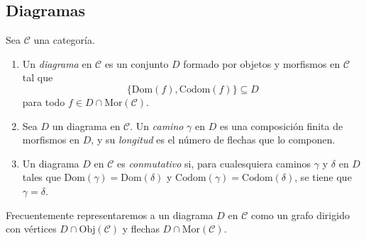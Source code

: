 \documentclass[tesis]{subfiles}
\begin{document}
%
%

\subsection*{Diagramas} \label{Ssec: Diagramas}

\begin{Def}

    Sea $\mathscr{C}$ una categoría. 
    \begin{enumerate}[label=(\alph*)]
    
        \item Un \emph{diagrama} en $\mathscr{C}$ es un conjunto $D$ formado por objetos y morfismos en $\mathscr{C}$ tal que
            \[
            \{\text{Dom}(f), \text{Codom}(f)\}\subseteq D
            \] 
            para todo $f\in D\cap\text{Mor}(\mathscr{C})$.

        \item Sea $D$ un diagrama en $\mathscr{C}$. Un \emph{camino} $\gamma$ en $D$ es una composición finita de morfismos en $D$, y su \emph{longitud} es el número de flechas que lo componen.

        \item Un diagrama $D$ en $\mathscr{C}$ es \emph{conmutativo} si, para cualesquiera caminos $\gamma$ y $\delta$ en $D$ tales que $\text{Dom}(\gamma) = \text{Dom}(\delta)$ y $\text{Codom}(\gamma) = \text{Codom}(\delta)$, se tiene que $\gamma=\delta$. 
    \end{enumerate}

    Frecuentemente representaremos a un diagrama $D$ en $\mathscr{C}$ como un grafo dirigido con vértices $D\cap\text{Obj}(\mathscr{C})$ y flechas $D\cap\text{Mor}(\mathscr{C})$.
\end{Def}
\end{document}
